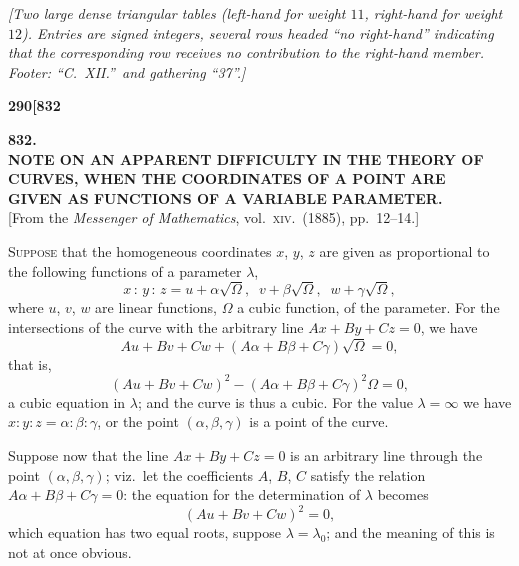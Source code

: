 \documentclass[11pt]{article}
\begin{document}
\medskip

\noindent\textit{[Two large dense triangular tables (left-hand for weight $11$, right-hand for weight $12$). Entries are signed integers, several rows headed ``no right-hand'' indicating that the corresponding row receives no contribution to the right-hand member. Footer: ``C.\ XII.''\ and gathering ``37''.]}

\bigskip


\newpage

\noindent\textbf{290}\hfill\hfill\textbf{[832}

\bigskip

\begin{center}
{\large\textbf{832.}}\\[0.7em]
{\large\textbf{NOTE ON AN APPARENT DIFFICULTY IN THE THEORY OF\\ CURVES, WHEN THE COORDINATES OF A POINT ARE\\ GIVEN AS FUNCTIONS OF A VARIABLE PARAMETER.}}\\[1em]
{\small [From the \textit{Messenger of Mathematics}, vol.\ \textsc{xiv}.\ (1885), pp.\ 12--14.]}
\end{center}

\bigskip

\noindent \textsc{Suppose} that the homogeneous coordinates $x$, $y$, $z$ are given as proportional to the following functions of a parameter $\lambda$,
\[
x \,:\, y \,:\, z = u + \alpha\sqrt{\Omega},\;\; v + \beta\sqrt{\Omega},\;\; w + \gamma\sqrt{\Omega},
\]
where $u$, $v$, $w$ are linear functions, $\Omega$ a cubic function, of the parameter. For the intersections of the curve with the arbitrary line $Ax + By + Cz = 0$, we have
\[
Au + Bv + Cw + (A\alpha + B\beta + C\gamma)\sqrt{\Omega} = 0,
\]
that is,
\[
(Au + Bv + Cw)^{2} - (A\alpha + B\beta + C\gamma)^{2}\Omega = 0,
\]
a cubic equation in $\lambda$; and the curve is thus a cubic. For the value $\lambda = \infty$ we have $x : y : z = \alpha : \beta : \gamma$, or the point $(\alpha, \beta, \gamma)$ is a point of the curve.

\medskip

Suppose now that the line $Ax + By + Cz = 0$ is an arbitrary line through the point $(\alpha, \beta, \gamma)$; viz.\ let the coefficients $A$, $B$, $C$ satisfy the relation $A\alpha + B\beta + C\gamma = 0$: the equation for the determination of $\lambda$ becomes
\[
(Au + Bv + Cw)^{2} = 0,
\]
which equation has two equal roots, suppose $\lambda = \lambda_{0}$; and the meaning of this is not at once obvious.
\end{document}
